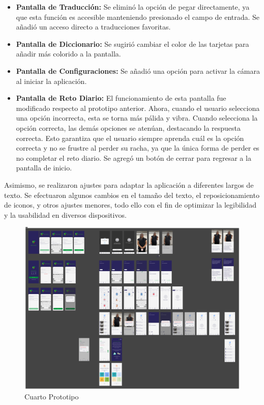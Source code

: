 \begin{itemize}
    \item \textbf{Pantalla de Traducción:} Se eliminó la opción de pegar directamente, ya que esta función es accesible manteniendo presionado el campo de entrada. Se añadió un acceso directo a traducciones favoritas.
    
    \item \textbf{Pantalla de Diccionario:} Se sugirió cambiar el color de las tarjetas para añadir más colorido a la pantalla.
    
    \item \textbf{Pantalla de Configuraciones:} Se añadió una opción para activar la cámara al iniciar la aplicación.
    
    \item \textbf{Pantalla de Reto Diario:} El funcionamiento de esta pantalla fue modificado respecto al prototipo anterior. Ahora, cuando el usuario selecciona una opción incorrecta, esta se torna más pálida y vibra. Cuando selecciona la opción correcta, las demás opciones se atenúan, destacando la respuesta correcta. Esto garantiza que el usuario siempre aprenda cuál es la opción correcta y no se frustre al perder su racha, ya que la única forma de perder es no completar el reto diario. Se agregó un botón de cerrar para regresar a la pantalla de inicio.
\end{itemize}

Asimismo, se realizaron ajustes para adaptar la aplicación a diferentes largos de texto. Se efectuaron algunos cambios en el tamaño del texto, el reposicionamiento de iconos, y otros ajustes menores, todo ello con el fin de optimizar la legibilidad y la usabilidad en diversos dispositivos.


\begin{figure} [H]
    \centering
    \includegraphics[width=1\linewidth]{figuras/prototipo4.png}
    \caption{Cuarto Prototipo}
    \label{fig:enter-label}
\end{figure}



